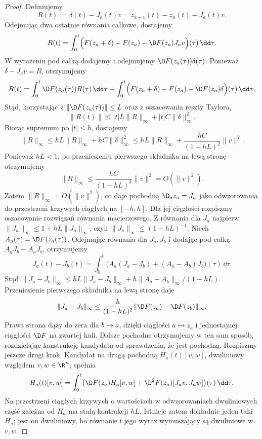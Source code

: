\begin{proof}
Definiujemy
\[
R(t):=\delta(t)-J_a(t)v
      =z_{a+v}(t)-z_a(t)-J_a(t)v.
\]
Odejmując dwa ostatnie równania całkowe, dostajemy
\[
R(t)
=
\int_0^t
\Bigl(
F(z_a+\delta)-F(z_a)-\D F(z_a)J_av
\Bigr)(\tau)\,\dd\tau.
\]
W wyrażeniu pod całką dodajemy i odejmujemy
$\D F(z_a(\tau))\delta(\tau)$. Ponieważ
$\delta-J_av=R$, otrzymujemy
\[
R(t)
=
\int_0^t \D F(z_a(\tau))R(\tau)\,\dd\tau
+
\int_0^t
\Bigl(
F(z_a+\delta)-F(z_a)-\D F(z_a)\delta
\Bigr)(\tau)\,\dd\tau.
\]
Stąd, korzystając z $\|\D F(z_a(\tau))\|\leq L$ oraz z oszacowania
reszty Taylora,
\[
\|R(t)\|
\leq |t|L\|R\|_\infty
     +|t|C\|\delta\|_\infty^2.
\]
Biorąc supremum po $|t|\leq h$, dostajemy
\[
\|R\|_\infty
\leq hL\|R\|_\infty+hC\|\delta\|_\infty^2
\leq hL\|R\|_\infty
+\frac{hC}{(1-hL)^2}\|v\|^2.
\]
Ponieważ $hL<1$, po przeniesieniu pierwszego składnika na lewą stronę
otrzymujemy
\[
\|R\|_\infty
\leq
\frac{hC}{(1-hL)^3}\|v\|^2
=
O(\|v\|^2).
\]
Zatem $\|R\|_\infty=O(\|v\|^2)$, co daje pochodną
$\D_a z_a=J_a$ jako odwzorowania do przestrzeni krzywych
ciągłych na $[-h,h]$. Dla jej ciągłości rozpiszmy
oszacowanie rozwiązań równania macierzowego.
Z równania dla $J_a$ najpierw
$\|J_a\|_\infty\leq1+hL\|J_a\|_\infty$,
czyli $\|J_a\|_\infty\leq(1-hL)^{-1}$.
Niech $A_a(\tau)=\D F(z_a(\tau))$.
Odejmując równania dla $J_a,J_b$ i dodając pod całką
$A_aJ_b-A_aJ_b$, otrzymujemy
\[
 J_a(t)-J_b(t)=\int_0^t
 \bigl(A_a(J_a-J_b)+(A_a-A_b)J_b\bigr)(\tau)\,\dd\tau.
\]
Stąd
$\|J_a-J_b\|_\infty
\leq hL\|J_a-J_b\|_\infty
+h\|A_a-A_b\|_\infty/(1-hL)$.
Przeniesienie pierwszego składnika na lewą stronę daje
\[
 \|J_a-J_b\|_\infty
 \leq\frac{h}{(1-hL)^2}
 \|\D F(z_a)-\D F(z_b)\|_\infty.
\]
Prawa strona dąży do zera dla $b\to a$, dzięki ciągłości
$a\mapsto z_a$ i jednostajnej ciągłości $\D F$ na zwartej kuli.
Dalsze pochodne otrzymujemy w ten sam sposób, rozdzielając
konstrukcję kandydata od sprawdzenia, że jest pochodną.
Rozpiszmy jeszcze drugi krok. Kandydat na drugą pochodną
$H_a(t)[v,w]$, dwuliniowy względem $v,w\in\R^n$, spełnia
\[
 H_a(t)[v,w]=\int_0^t\bigl(
 \D F(z_a)H_a[v,w]
 +\D^2F(z_a)[J_av,J_aw]\bigr)(\tau)\,\dd\tau.
\]
Na przestrzeni ciągłych krzywych o wartościach w odwzorowaniach
dwuliniowych część zależna od $H_a$ ma stałą kontrakcji $hL$.
Istnieje zatem dokładnie jeden taki $H_a$; jest on dwuliniowy,
bo równanie i jego wyraz wymuszający są dwuliniowe w $v,w$.


\end{proof}
